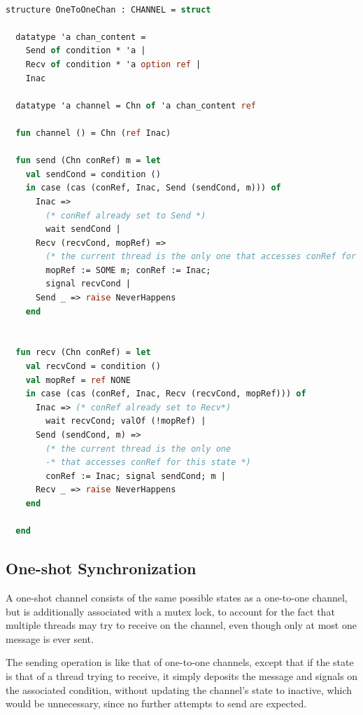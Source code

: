 \documentclass[10pt]{article}
\begin{document}
\begin{lstlisting}[language=ML, mathescape]

structure OneToOneChan : CHANNEL = struct

  datatype 'a chan_content =
    Send of condition * 'a |
    Recv of condition * 'a option ref |
    Inac  

  datatype 'a channel = Chn of 'a chan_content ref

  fun channel () = Chn (ref Inac)

  fun send (Chn conRef) m = let
    val sendCond = condition ()
    in case (cas (conRef, Inac, Send (sendCond, m))) of
      Inac => 
        (* conRef already set to Send *)
        wait sendCond |
      Recv (recvCond, mopRef) =>
        (* the current thread is the only one that accesses conRef for this state *)
        mopRef := SOME m; conRef := Inac;
        signal recvCond |
      Send _ => raise NeverHappens
    end


  fun recv (Chn conRef) = let
    val recvCond = condition ()
    val mopRef = ref NONE 
    in case (cas (conRef, Inac, Recv (recvCond, mopRef))) of
      Inac => (* conRef already set to Recv*)
        wait recvCond; valOf (!mopRef) |
      Send (sendCond, m) =>
        (* the current thread is the only one
        -* that accesses conRef for this state *)
        conRef := Inac; signal sendCond; m |
      Recv _ => raise NeverHappens
    end 

  end
  \end{lstlisting}

\subsection{One-shot Synchronization}

A one-shot channel consists of the same possible states as a one-to-one channel, but is
additionally associated with a mutex lock, to account for the fact that multiple threads may
try to receive on the channel, even though only at most one message is ever sent.

The sending operation is like that of one-to-one channels,
except that if the state is that of a
thread trying to receive, it simply deposits the message and signals on the associated
condition, without updating the channel's state to inactive, which would be unnecessary, since
no further attempts to send are expected.
\end{document}
